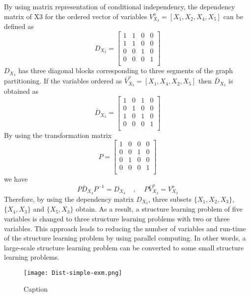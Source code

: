 \documentclass{article}
\begin{document}
By using matrix representation of conditional independency, the dependency matrix of X3 for the ordered vector of variables $V^o_{X_3} = [X_1, X_2, X_4, X_5]$ can be defined as
\begin{equation*}
D_{X_3} = \left[{\begin{array}{*{20}{c}} 
1 & 1 & 0 & 0\\
1 & 1 & 0 & 0\\
0 & 0 & 1 & 0\\
0 & 0 & 0 & 1\\
\end{array}}\right]
\end{equation*}
$D_{X_3}$ has three diagonal blocks corresponding to three segments of the graph partitioning. If the variables ordered as $\bar V^o_{X_3} = [X_1, X_4, X_2, X_5]$ then $\bar D_{X_3}$ is obtained as
\begin{equation*}
\bar D_{X_3} = \left[{\begin{array}{*{20}{c}} 
1 & 0 & 1 & 0\\
0 & 1 & 0 & 0\\
1 & 0 & 1 & 0\\
0 & 0 & 0 & 1\\
\end{array}}\right]
\end{equation*}
By using the transformation matrix
\begin{equation*}
P = \left[{\begin{array}{*{20}{c}}
1 & 0 & 0 & 0\\
0 & 0 & 1 & 0\\
0 & 1 & 0 & 0\\
0 & 0 & 0 & 1\\
\end{array}}\right]
\end{equation*}
we have 
\begin{equation}
    P\bar D_{X_3} P^{-1} = D_{X_3}~~~~~,~~~~~P\bar V^o_{X_3} = V^o_{X_3}
\end{equation}
Therefore, by using the dependency matrix $D_{X_3}$, three subsets $\{X_1,X_2,X_3\}$, $\{X_4,X_3\}$ and $\{X_5,X_3\}$ obtain. As a result, a structure learning problem of five variables is changed to three structure learning problems with two or three variables. This approach leads to reducing the number of variables and run-time of the structure learning problem by using parallel computing. In other words, a large-scale structure learning problem can be converted to some small structure learning problems.

\begin{figure}[!ht]
    \centering
    \texttt{[image: Dist-simple-exm.png]}
    \caption{Caption}
    \label{f-simple}
\end{figure}
\end{document}
